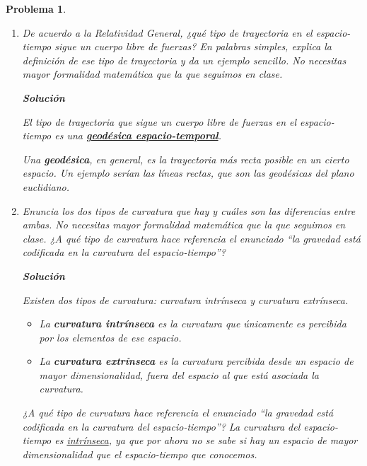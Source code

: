 \documentclass[12pt]{article}
\theoremstyle{break}
\newtheorem{exercise}{Problema}
\theoremstyle{nonumberbreak}
\newcommand*{\inlinesol}{\vspace*{10pt}\textbf{Solución}\vspace*{10pt}}
\begin{document}
    \pagebreak
    \begin{exercise}
        \begin{enumerate}[label = \alph*)]
            \item De acuerdo a la Relatividad General, ¿qué tipo de trayectoria en el espacio-tiempo sigue un cuerpo libre de fuerzas? En palabras simples, explica la definición de ese tipo de trayectoria y da un ejemplo sencillo. No necesitas mayor formalidad matemática que la que seguimos en clase.
            
            \inlinesol

            El tipo de trayectoria que sigue un cuerpo libre de fuerzas en el espacio-tiempo es una \ul{\textbf{geodésica espacio-temporal}}.\par

            Una \textbf{geodésica}, en general, es la trayectoria más recta posible en un cierto espacio. Un ejemplo serían las líneas rectas, que son las geodésicas del plano euclidiano.

            \item Enuncia los dos tipos de curvatura que hay y cuáles son las diferencias entre ambas. No necesitas mayor formalidad matemática que la que seguimos en clase. ¿A qué tipo de curvatura hace referencia el enunciado ``la gravedad está codificada en la curvatura del espacio-tiempo''?
            
            \inlinesol

            Existen dos tipos de curvatura: curvatura intrínseca y curvatura extrínseca.

            \begin{itemize}[label = \textbullet]
                \item La \textbf{curvatura intrínseca} es la curvatura que únicamente es percibida por los \emph{elementos} de ese espacio. 
                \item La \textbf{curvatura extrínseca} es la curvatura percibida desde un espacio de mayor dimensionalidad, fuera del espacio al que está asociada la curvatura.
            \end{itemize}

            ¿A qué tipo de curvatura hace referencia el enunciado ``la gravedad está codificada en la curvatura del espacio-tiempo''? La curvatura del espacio-tiempo es \ul{intrínseca}, ya que por ahora no se sabe si hay un espacio de mayor dimensionalidad que el espacio-tiempo que conocemos.


\end{enumerate}
\end{exercise}
\end{document}
